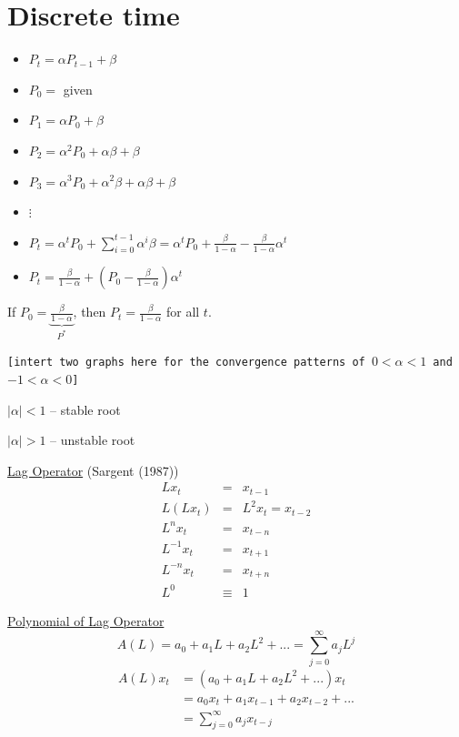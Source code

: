 \documentclass[twoside]{article}
\begin{document}
\section{Discrete time}
\begin{itemize}
    \item [] $P_t = \alpha P_{t-1} + \beta$
    \item [] $P_0 = $ given
    \item [] $P_1 = \alpha P_0 + \beta$
    \item [] $P_2 = \alpha^2 P_0 + \alpha \beta  + \beta$
    \item [] $P_3 = \alpha^3 P_0 + \alpha^2 \beta + \alpha \beta + \beta$
    \item [] $\vdots$
    \item [] $P_t = \alpha^t P_0 + \sum_{i=0}^{t-1} \alpha^i \beta = \alpha^t P_0 + \frac{\beta}{1- \alpha} - \frac{\beta}{1- \alpha} \alpha^t$
    \item [] $P_t = \frac{\beta}{1- \alpha} + (P_0 - \frac{\beta}{1- \alpha})  \alpha^t$
\end{itemize}
If $P_0 = \underbrace{\frac{\beta}{1- \alpha}}_{P^*}$, then $P_t = \frac{\beta}{1- \alpha}$ for all $t$.

\begin{center}
    \texttt{[intert two graphs here for the convergence patterns of $0<\alpha<1$ and $-1<\alpha<0$]} 
\end{center}

$|\alpha| < 1$ -- stable root

$|\alpha| > 1$ -- unstable root

\underline{Lag Operator} (Sargent (1987))
\begin{eqnarray}
    L x_t &=& x_{t-1}\\
    L ( Lx_t) &=& L^2 x_t = x_{t-2}\\
    L^n x_t &=& x_{t-n}\\
    L^{-1}x_t &=& x_{t+1}\\
    L^{-n} x_t &=& x_{t+n}\\
    L^{0} &\equiv& 1
\end{eqnarray}

\underline{Polynomial of Lag Operator}
\begin{equation}
    A(L) = a_0 + a_1 L + a_2 L^2 + ... = \sum_{j=0}^{\infty} a_j L^j
\end{equation}
\begin{equation}
\begin{aligned}
    A(L)x_t &= (a_0 + a_1 L + a_2 L^2 + ...)x_t \\
    &= a_0 x_t + a_1 x_{t-1} + a_2 x_{t-2} + ... \\
    &= \sum_{j=0}^{\infty} a_j x_{t-j}
\end{aligned}
\end{equation}
\end{document}
